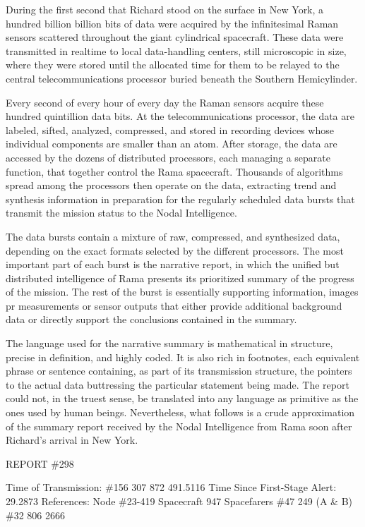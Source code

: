 \documentclass[]{article}
\begin{document}
{{During the first second that Richard stood on the surface in New York, a hundred billion billion bits of data were acquired by the infinitesimal Raman sensors scattered throughout the giant cylindrical spacecraft.  These data were transmitted in realtime to local data-handling centers, still microscopic in size, where they were stored until the allocated time for them to be relayed to the central telecommunications processor buried beneath the Southern Hemicylinder.

Every second of every hour of every day the Raman sensors acquire these hundred quintillion data bits.  At the telecommunications processor, the data are labeled, sifted, analyzed, compressed, and stored in recording devices whose individual components are smaller than an atom.  After storage, the data are accessed by the dozens of distributed processors, each managing a separate function, that together control the Rama spacecraft.  Thousands of algorithms spread among the processors then operate on the data, extracting trend and synthesis information in preparation for the regularly scheduled data bursts that transmit the mission status to the Nodal Intelligence.

The data bursts contain a mixture of raw, compressed, and synthesized data, depending on the exact formats selected by the different processors.  The most important part of each burst is the narrative report, in which the unified but distributed intelligence of Rama presents its prioritized summary of the progress of the mission.  The rest of the burst is essentially supporting information, images pr measurements or sensor outputs that either provide additional background data or directly support the conclusions contained in the summary.

The language used for the narrative summary is mathematical in structure, precise in definition, and highly coded.  It is also rich in footnotes, each equivalent phrase or sentence containing, as part of its transmission structure, the pointers to the actual data buttressing the particular statement being made.  The report could not, in the truest sense, be translated into any language as primitive as the ones used by human beings.  Nevertheless, what follows is a crude approximation of the summary report received by the Nodal Intelligence from Rama soon after Richard’s arrival in New York.

REPORT \#298

Time of Transmission: \#156 307 872 491.5116 Time Since First-Stage Alert: 29.2873 References: Node \#23-419 Spacecraft 947 Spacefarers \#47 249 (A \& B) \#32 806 2666

}}
\end{document}
